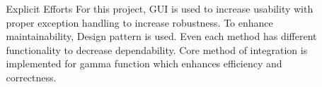 \documentclass[final]{beamer}
\newlength{\sepwid}
\newlength{\onecolwid}
\newlength{\twocolwid}
\begin{document}
\begin{frame}
\begin{columns}[t]
\begin{column}{\twocolwid}
\begin{columns}[t,totalwidth=\twocolwid]
\begin{column}{\onecolwid}
\end{column} %

\end{columns} %



\begin{columns}[t,totalwidth=\twocolwid] %


\begin{column}{\sepwid}\end{column} %

\begin{column}{\onecolwid} %


\end{column} %

\end{columns} %

\end{column} %

\begin{column}{\sepwid}\end{column} %

\begin{column}{\onecolwid} %


\begin{exampleblock}{Explicit Efforts}
\small{For this project, GUI is used to increase usability with proper exception handling to increase robustness. To enhance maintainability, Design pattern is used. Even each method has different functionality to decrease dependability. Core method of integration is implemented for gamma function which enhances efficiency and correctness.}


\end{exampleblock}



\end{column}
\end{columns}
\end{frame}
\end{document}
